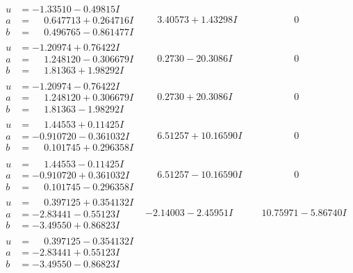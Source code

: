 \documentclass[1p]{elsarticle_modified}
\theoremstyle{definition}
\begin{document}
$$\begin{array}{c|c|c}
\begin{aligned}
u &= -1.33510 - 0.49815 I \\
a &= \phantom{-}0.647713 + 0.264716 I \\
b &= \phantom{-}0.496765 - 0.861477 I\end{aligned}
 & \phantom{-}3.40573 + 1.43298 I & \phantom{-0.000000 } 0 \\ \hline\begin{aligned}
u &= -1.20974 + 0.76422 I \\
a &= \phantom{-}1.248120 - 0.306679 I \\
b &= \phantom{-}1.81363 + 1.98292 I\end{aligned}
 & \phantom{-}0.2730 - 20.3086 I & \phantom{-0.000000 } 0 \\ \hline\begin{aligned}
u &= -1.20974 - 0.76422 I \\
a &= \phantom{-}1.248120 + 0.306679 I \\
b &= \phantom{-}1.81363 - 1.98292 I\end{aligned}
 & \phantom{-}0.2730 + 20.3086 I & \phantom{-0.000000 } 0 \\ \hline\begin{aligned}
u &= \phantom{-}1.44553 + 0.11425 I \\
a &= -0.910720 - 0.361032 I \\
b &= \phantom{-}0.101745 + 0.296358 I\end{aligned}
 & \phantom{-}6.51257 + 10.16590 I & \phantom{-0.000000 } 0 \\ \hline\begin{aligned}
u &= \phantom{-}1.44553 - 0.11425 I \\
a &= -0.910720 + 0.361032 I \\
b &= \phantom{-}0.101745 - 0.296358 I\end{aligned}
 & \phantom{-}6.51257 - 10.16590 I & \phantom{-0.000000 } 0 \\ \hline\begin{aligned}
u &= \phantom{-}0.397125 + 0.354132 I \\
a &= -2.83441 - 0.55123 I \\
b &= -3.49550 + 0.86823 I\end{aligned}
 & -2.14003 - 2.45951 I & \phantom{-}10.75971 - 5.86740 I \\ \hline\begin{aligned}
u &= \phantom{-}0.397125 - 0.354132 I \\
a &= -2.83441 + 0.55123 I \\
b &= -3.49550 - 0.86823 I\end{aligned}

\end{array}$$
\end{document}
